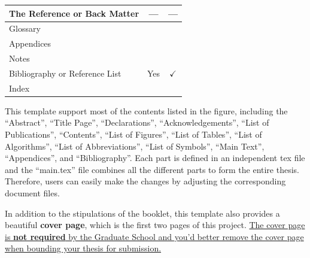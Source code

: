 \begin{center}
\begin{longtable}{|l|c|c|}
\textbf{The Reference or Back Matter} &    ---    &   ---       \\ \hline \hline
Glossary                  &              &                      \\
Appendices                &              &                      \\
Notes                     &              &                      \\
Bibliography or Reference List & Yes          &  $\checkmark$   \\
Index                     &              &                      \\
\hline
\end{longtable}
\end{center}
This template support most of the contents listed in the figure, including the ``Abstract'', ``Title Page'', ``Declarations'', ``Acknowledgements'', ``List of Publications'', ``Contents'', ``List of Figures'', ``List of Tables'', ``List of Algorithms'', ``List of Abbreviations'', ``List of Symbols'', ``Main Text'', ``Appendices'', and ``Bibliography''. Each part is defined in an independent tex file and the ``main.tex'' file combines all the different parts to form the entire thesis. Therefore, users can easily make the changes by adjusting the corresponding document files.

In addition to the stipulations of the booklet, this template also provides a beautiful \textbf{cover page}, which is the first two pages of this project. \uline{The cover page is \textbf{not required} by the Graduate School and you'd better remove the cover page when bounding your thesis for submission.}








